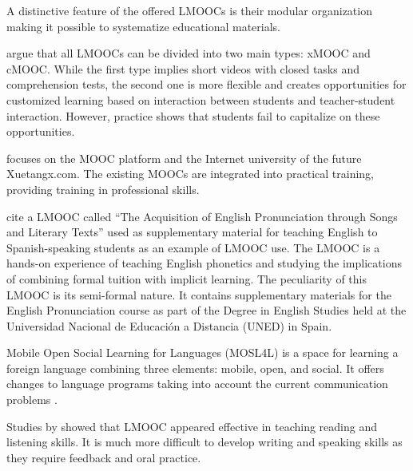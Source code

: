 \documentclass[english]{textolivre}
\begin{document}
A distinctive feature of the offered LMOOCs is their modular organization making it possible to systematize educational materials.

\textcite{jitpaisarnwattana_learners_2021} argue that all LMOOCs can be divided into two main types: xMOOC and cMOOC. While the first type implies short videos with closed tasks and comprehension tests, the second one is more flexible and creates opportunities for customized learning based on interaction between students and teacher-student interaction. However, practice shows that students fail to capitalize on these opportunities.

\textcite{xiao_motivation_2021} focuses on the MOOC platform and the Internet university of the future Xuetangx.com. The existing MOOCs are integrated into practical training, providing training in professional skills.

\textcite{estebas-vilaplana_role_2020} cite a LMOOC called “The Acquisition of English Pronunciation through Songs and Literary Texts” used as supplementary material for teaching English to Spanish-speaking students as an example of LMOOC use. The LMOOC is a hands-on experience of teaching English phonetics and studying the implications of combining formal tuition with implicit learning. The peculiarity of this LMOOC is its semi-formal nature. It contains supplementary materials for the English Pronunciation course as part of the Degree in English Studies held at the Universidad Nacional de Educación a Distancia (UNED) in Spain.

Mobile Open Social Learning for Languages (MOSL4L) is a space for learning a foreign language combining three elements: mobile, open, and social. It offers changes to language programs taking into account the current communication problems \cite{kukulska-hulme_mobile_2021}.

Studies by \textcite{pareja-lora_learning_2016,vorobyeva_language_2018} showed that LMOOC appeared effective in teaching reading and listening skills. It is much more difficult to develop writing and speaking skills as they require feedback and oral practice.
\end{document}
